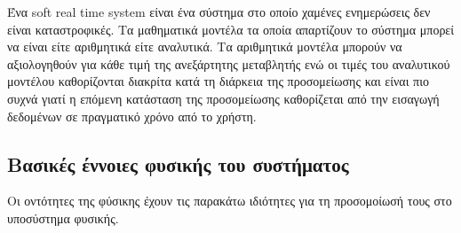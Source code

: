 Ένα soft real time system είναι ένα σύστημα στο οποίο χαμένες ενημερώσεις δεν είναι καταστροφικές.
Τα μαθηματικά μοντέλα τα οποία απαρτίζουν το σύστημα μπορεί να είναι είτε αριθμητικά είτε αναλυτικά. Τα αριθμητικά μοντέλα μπορούν να αξιολογηθούν για κάθε τιμή της ανεξάρτητης μεταβλητής ενώ οι τιμές του αναλυτικού μοντέλου καθορίζονται διακρίτα κατά τη διάρκεια της προσομείωσης και είναι πιο συχνά γιατί η επόμενη κατάσταση της προσομείωσης καθορίζεται από την εισαγωγή δεδομένων σε πραγματικό χρόνο από το χρήστη. \cite{realtime_collision04}

\subsection{Βασικές έννοιες φυσικής του συστήματος}
Οι οντότητες της φύσικης έχουν τις παρακάτω ιδιότητες για τη προσομοίωσή τους στο υποσύστημα φυσικής.

